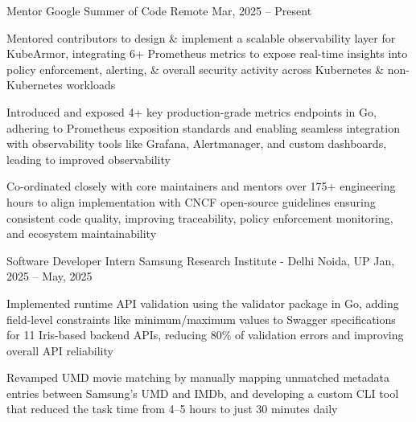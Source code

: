 \documentclass[]{awesome-cv}
\begin{document}
\vspace{-3mm}
\begin{cventries}
    \cventry
    {Mentor}
    {Google Summer of Code}
    {Remote}
    {Mar, 2025 – Present}
    {\begin{cvitems}
        \item Mentored contributors to design \& implement a scalable observability layer for KubeArmor, integrating 6+ Prometheus metrics to expose real-time insights into policy enforcement, alerting, \& overall security activity across Kubernetes \& non-Kubernetes workloads
        \item Introduced and exposed 4+ key production-grade metrics endpoints in Go, adhering to Prometheus exposition standards and enabling seamless integration with observability tools like Grafana, Alertmanager, and custom dashboards, leading to improved observability
        \item Co-ordinated closely with core maintainers and mentors over 175+ engineering hours to align implementation with CNCF open-source guidelines ensuring consistent code quality, improving traceability, policy enforcement monitoring, and ecosystem maintainability
        \vspace{-2mm}
        \end{cvitems}}
    \vspace{-2mm}
    \cventry
    {Software Developer Intern}
    {Samsung Research Institute - Delhi}
    {Noida, UP}
    {Jan, 2025 – May, 2025}
    {\begin{cvitems}
        \item Implemented runtime API validation using the validator package in Go, adding field-level constraints like minimum/maximum values to Swagger specifications for 11 Iris-based backend APIs, reducing 80\% of validation errors and improving overall API reliability
        \item Revamped UMD movie matching by manually mapping unmatched metadata entries between Samsung’s UMD and IMDb, and developing a custom CLI tool that reduced the task time from 4–5 hours to just 30 minutes daily

\end{cvitems}}
\end{cventries}
\end{document}
